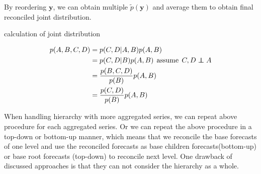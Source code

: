 \documentclass{article}
\newcommand\independent{\protect\mathpalette{\protect\independenT}{\perp}}
\def\independenT#1#2{\mathrel{\rlap{$#1#2$}\mkern2mu{#1#2}}}
\begin{document}
   By reordering $\bm{y}$, we can obtain multiple $\tilde p(\bm{y})$ and average them to obtain final reconciled joint distribution.

   \begin{algorithm}[H]
     \caption{calculation of joint distribution}
     \[
      \begin{aligned}
        p(A,B,C,D) &= p(C, D|A,B)p(A,B) \\ 
          &= p(C,D|B)p(A,B)  \:\: \textrm{assume}\:\: C,D \independent {A}\\
          &= \frac{p(B,C,D)}{p(B)}p(A,B) \\
          &= \frac{p(C,D)}{p(B)}p(A,B)
     \end{aligned}
     \]
   \end{algorithm}


   When handling hierarchy with more aggregated series, we can repeat above procedure for each aggregated series. 
   Or we can repeat the above procedure in a top-down or bottom-up manner, which means that we reconcile the base forecasts of one level and use the reconciled forecasts as base children forecasts(bottom-up) or base root forecasts (top-down) to reconcile next level. One drawback of discussed approaches is that they can not consider the hierarchy as a whole.

    
    
\end{document}
